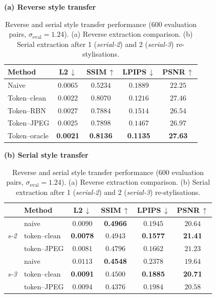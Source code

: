 \documentclass[runningheads]{llncs}
\begin{document}
\begin{table}[t]
\centering
\caption{Reverse and serial style transfer performance ($600$ evaluation pairs, $\sigma_{\text{eval}}\!=\!1.24$). (a) Reverse extraction comparison. (b) Serial extraction after 1 (\emph{serial-2}) and 2 (\emph{serial-3}) re-stylisations.}
\label{tab:reverse_and_serial}
\small
\textbf{(a) Reverse style transfer}\par\smallskip
\setlength{\tabcolsep}{5pt}
\begin{tabular}{lcccc}
\toprule
\textbf{Method} & \textbf{L2}\,$\downarrow$ & \textbf{SSIM}\,$\uparrow$ & \textbf{LPIPS}\,$\downarrow$ & \textbf{PSNR}\,$\uparrow$ \\
\midrule
Naive       & $0.0065$ & $0.5234$ & $0.1889$ & $22.25$ \\
Token--clean & $0.0022$ & $0.8070$ & $0.1216$ & $27.46$ \\
Token--RBN   & $0.0027$ & $0.7884$ & $0.1514$ & $26.54$ \\
Token--JPEG  & $0.0025$ & $0.7898$ & $0.1467$ & $26.97$ \\
Token--oracle & \textbf{0.0021} & \textbf{0.8136} & \textbf{0.1135} & \textbf{27.63} \\
\bottomrule
\end{tabular}
\par\medskip
\textbf{(b) Serial style transfer}\par\smallskip
\setlength{\tabcolsep}{4pt}
\begin{tabular}{llcccc}
\toprule
& \textbf{Method} & \textbf{L2}\,$\downarrow$ & \textbf{SSIM}\,$\uparrow$ & \textbf{LPIPS}\,$\downarrow$ & \textbf{PSNR}\,$\uparrow$ \\
\midrule
\multirow{3}{*}{\emph{s-2}}
 & naive       & $0.0090$ & \textbf{0.4966} & $0.1945$ & $20.64$ \\
 & token--clean & \textbf{0.0078} & $0.4943$ & \textbf{0.1577} & \textbf{21.41} \\
 & token--JPEG  & $0.0081$ & $0.4796$ & $0.1662$ & $21.23$ \\
\midrule
\multirow{3}{*}{\emph{s-3}}
 & naive       & $0.0113$ & \textbf{0.4548} & $0.2378$ & $19.64$ \\
 & token--clean & \textbf{0.0091} & $0.4500$ & \textbf{0.1885} & \textbf{20.71} \\
 & token--JPEG  & $0.0094$ & $0.4376$ & $0.1984$ & $20.58$ \\
\bottomrule
\end{tabular}
\end{table}
\end{document}
